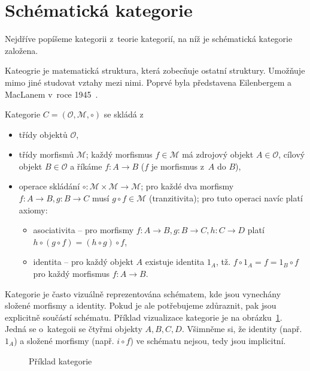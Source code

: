 \section{Schématická kategorie}

Nejdříve popíšeme kategorii z~teorie kategorií, na níž je schématická kategorie založena.

Kateogrie je matematická struktura, která zobecňuje ostatní struktury.
Umožňuje mimo jiné studovat vztahy mezi nimi.
Poprvé byla představena Eilenbergem a MacLanem v~roce 1945~\cite{eilenberg_1945}.

Kategorie $C=(\mathcal O, \mathcal M, \circ)$ se skládá
z~\begin{itemize}
  \item třídy objektů $\mathcal O$,
  \item třídy morfismů $\mathcal M$; každý morfismus $f \in \mathcal M$ má zdrojový objekt $A\in\mathcal O$, cílový objekt $B\in\mathcal O$ a říkáme $f: A\to B$ ($f$ je morfismus z~$A$ do $B$),
  \item operace skládání $\circ\colon \mathcal M\times\mathcal M \to \mathcal M$; pro každé dva morfismy $f\colon A\to B, g\colon B\to C$ musí $g\circ f\in \mathcal M$ (tranzitivita); pro tuto operaci navíc platí axiomy:
        \begin{itemize}
          \item asociativita -- pro morfismy $f\colon A\to B, g\colon B\to C, h\colon C\to D$ platí $h\circ (g \circ f) = (h\circ g)\circ f$,
          \item identita -- pro každý objekt $A$ existuje identita $1_A$, tž. $f\circ 1_A = f = 1_B\circ f$ pro každý morfismus $f: A\to B$.
        \end{itemize}
\end{itemize}

Kategorie je často vizuálně reprezentována schématem, kde jsou vynechány složené morfismy a identity.
Pokud je ale potřebujeme zdůraznit, pak jsou explicitně součástí schématu.
Příklad vizualizace kategorie je na obrázku~\ref{fig:category-example}.
Jedná se o~kategoii se čtyřmi objekty $A, B, C, D$.
Všimněme si, že identity (např. $1_A$) a složené morfismy (např. $i\circ f$) ve schématu nejsou, tedy jsou implicitní.

\begin{figure}[!htb]
  \begin{center}
  \end{center}
  \caption{Příklad kategorie}
  \label{fig:category-example}
\end{figure}

